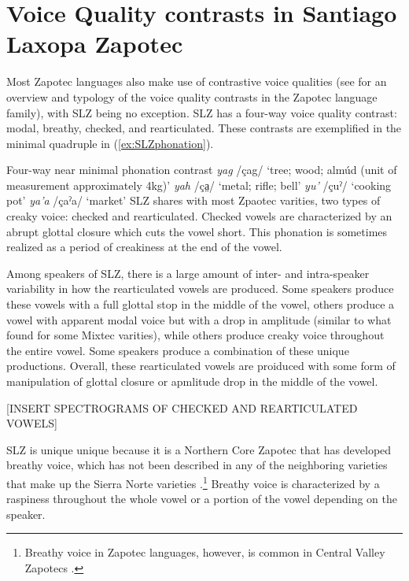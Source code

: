 \section{Voice Quality contrasts in Santiago Laxopa Zapotec} \label{sec:SLZ-voicequality}
Most Zapotec languages also make use of contrastive voice qualities (see \cite{ariza-garciaPhonationTypesTones2018} for an overview and typology of the voice quality contrasts in the Zapotec language family), with SLZ being no exception. SLZ
has a four-way voice quality contrast: modal, breathy, checked, and rearticulated. These contrasts are exemplified in the minimal quadruple in (\ref{ex:SLZphonation}).

\ea \label{ex:SLZphonation} Four-way near minimal phonation contrast
    \ea \textit{yag}  /çag/ `tree; wood; almúd (unit of measurement approximately 4kg)'
    \ex \textit{yah}  /ça̤/ `metal; rifle; bell'
    \ex \textit{yu'}  /çuˀ/  `cooking pot'
    \ex \textit{ya'a}  /çaˀa/  `market'
    \z
\z
SLZ shares with most Zpaotec varities, two types of creaky voice: checked and rearticulated. Checked vowels are characterized by an abrupt glottal closure which cuts the vowel short. This phonation is sometimes realized as a period of creakiness at the end of the vowel.

Among speakers of SLZ, there is a large amount of inter- and intra-speaker variability in how the rearticulated vowels are produced. Some speakers produce these vowels with a full glottal stop in the middle of the vowel, others produce a vowel with apparent modal voice but with a drop in amplitude (similar to what \cite{gerfenProductionPerceptionLaryngealized2005} found for some Mixtec varities), while others produce creaky voice throughout the entire vowel. Some speakers produce a combination of these unique productions. Overall, these rearticulated vowels are proiduced with some form of manipulation of glottal closure or apmlitude drop in the middle of the vowel.

[INSERT SPECTROGRAMS OF CHECKED AND REARTICULATED VOWELS]

SLZ is unique unique because it is a Northern Core Zapotec that has developed breathy voice, which has not been described in any of the neighboring varieties that make up the Sierra Norte varieties \citep{nellisFortisLenisCajonos1980,jaegerInitialConsonantClusters1982,butlerh.DiccionarioZapotecoYatzachi1997,avelinobecerraTopicsYalalagZapotec2004,sonnenscheinDescriptiveGrammarSan2005,longDiccionarioZapotecoSan2005}.\footnote{Breathy voice in Zapotec languages, however, is common in Central Valley Zapotecs \citep{munroDiCsyonaaryTee1999,espositoSantaAnaValle2004,espositoVariationContrastivePhonation2010,uchiharaToneRegistrogenesisQuiavini2016,ariza-garciaPhonationTypesTones2018}.} Breathy voice is characterized by a raspiness throughout the whole vowel or a portion of the vowel depending on the speaker.

